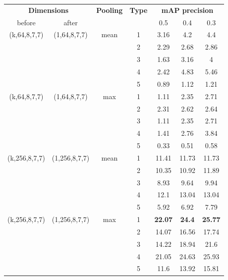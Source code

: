 \begin{center}
\begin{longtable}{||c | c | c| c||c c c||}

  \hline
  \multicolumn{2}{||c|}{\textbf{Dimensions}} & \multirow{2}{*}{ \textbf{Pooling}} &\multirow{2}{*}{\textbf{Type}} & \multicolumn{3}{|c||}{\textbf{mAP precision}}\\

   before & after &  {} & {} &  0.5 &  0.4 & 0.3 \\
 \hline   \hline
 \multirow{5}{*}{(k,64,8,7,7)} & \multirow{5}{*}{(1,64,8,7,7)} & \multirow{5}{*}{mean}  & 1 &  3.16 & 4.2 & 4.4    \\
  \cline{4-7}
  {} & {} & {} & 2 & 2.29 & 2.68 & 2.86    \\
    \cline{4-7}
  {} & {} & {} & 3 & 1.63 & 3.16 &  4  \\
    \cline{4-7}
  {} & {} & {} & 4 & 2.42 & 4.83 & 5.46  \\  
    \cline{4-7}
  {} & {} & {} & 5 & 0.89 &1.12 & 1.21  \\
  \hline
 \multirow{5}{*}{(k,64,8,7,7)} & \multirow{5}{*}{(1,64,8,7,7)} & \multirow{5}{*}{max}  & 1 & 1.11 & 2.35 & 2.71 \\
    \cline{4-7}
  {} & {} & {} & 2 & 2.31 & 2.62 & 2.64 \\
    \cline{4-7}
  {} & {} & {} & 3 & 1.11 & 2.35 & 2.71 \\
    \cline{4-7}
  {} & {} & {} & 4 & 1.41 & 2.76 & 3.84  \\
    \cline{4-7}
  {} & {} & {} & 5 & 0.33 & 0.51 &0.58  \\

  \hline   \hline

 \multirow{5}{*}{(k,256,8,7,7)} & \multirow{5}{*}{(1,256,8,7,7)} & \multirow{5}{*}{mean}  & 1 &  11.41 & 11.73 & 11.73 \\

    \cline{4-7}
  {} & {} & {} & 2 & 10.35 & 10.92 &11.89 \\
    \cline{4-7}
  {} & {} & {} & 3 & 8.93 & 9.64 & 9.94 \\
    \cline{4-7}
  {} & {} & {} & 4 & 12.1 & 13.04 &13.04 \\
    \cline{4-7}
  {} & {} & {} & 5 & 5.92 & 6.92 & 7.79 \\
    \hline
 \multirow{5}{*}{(k,256,8,7,7)} & \multirow{5}{*}{(1,256,8,7,7)} & \multirow{5}{*}{max}  & 1  & \textbf{22.07} & \textbf{24.4} &  \textbf{25.77} \\
    \cline{4-7}
  {} & {} & {} & 2  & 14.07 & 16.56 & 17.74 \\
    \cline{4-7}
  {} & {} & {} & 3  & 14.22 & 18.94 &21.6 \\
    \cline{4-7}
  {} & {} & {} & 4  & 21.05 & 24.63 & 25.93 \\
    \cline{4-7}
  {} & {} & {} & 5  & 11.6 & 13.92 & 15.81 \\
  \hline   
  

\end{longtable}
\end{center}
